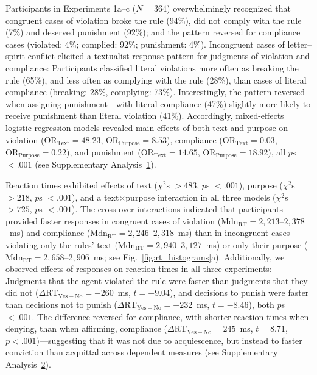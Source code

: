 \documentclass[pdflatex,sn-nature]{sn-jnl}
\begin{document}
Participants in Experiments 1a--c ($N = 364$) overwhelmingly recognized that congruent cases of violation broke the rule (94\%), did not comply with the rule (7\%) and deserved punishment (92\%); and the pattern reversed for compliance cases (violated: 4\%; complied: 92\%; punishment: 4\%). Incongruent cases of letter--spirit conflict elicited a textualist response pattern for judgments of violation and compliance: Participants classified literal violations more often as breaking the rule (65\%), and less often as complying with the rule (28\%), than cases of literal compliance (breaking: 28\%, complying: 73\%)\cite{ref3,ref8}. Interestingly, the pattern reversed when assigning punishment---with literal compliance (47\%) slightly more likely to receive punishment than literal violation (41\%). Accordingly, mixed-effects logistic regression models revealed main effects of both text and purpose on violation ($\mathrm{OR}_\text{Text} = 48.23$, $\mathrm{OR}_\text{Purpose} = 8.53$), compliance ($\mathrm{OR}_\text{Text} = 0.03$, $\mathrm{OR}_\text{Purpose} = 0.22$), and punishment ($\mathrm{OR}_\text{Text} = 14.65$, $\mathrm{OR}_\text{Purpose} = 18.92$), all $p$s $< .001$ (see Supplementary Analysis~\hyperref[supp:analysis1]{1}).

Reaction times exhibited effects of text ($\chi^2$s $> 483$, $p$s $<.001$), purpose ($\chi^2$s $> 218$, $p$s $< .001$), and a text$\times$purpose interaction in all three models ($\chi^2$s $> 725$, $p$s $< .001$). The cross-over interactions indicated that participants provided faster responses in congruent cases of violation ($\mathrm{Mdn_{RT}} = 2{,}213$--$2{,}378$~ms) and compliance ($\mathrm{Mdn_{RT}} = 2{,}246$--$2{,}318$~ms) than in incongruent cases violating only the rules' text ($\mathrm{Mdn_{RT}} = 2{,}940$--$3{,}127$~ms) or only their purpose ($\mathrm{Mdn_{RT}} = 2{,}658$--$2{,}906$~ms; see Fig.~\ref{fig:rt_histograms}a). Additionally, we observed effects of responses on reaction times in all three experiments: Judgments that the agent violated the rule were faster than judgments that they did not ($\Delta\mathrm{RT_{Yes-No}} = -260$~ms, $t = -9.04$), and decisions to punish were faster than decisions not to punish ($\Delta\mathrm{RT_{Yes-No}} = -232$~ms, $t = -8.46$), both $p$s $< .001$. The difference reversed for compliance, with shorter reaction times when denying, than when affirming, compliance ($\Delta\mathrm{RT_{Yes-No}} = 245$~ms, $t = 8.71$, $p < .001$)---suggesting that it was not due to acquiescence, but instead to faster conviction than acquittal across dependent measures (see Supplementary Analysis~\hyperref[supp:analysis2]{2}).
\end{document}
